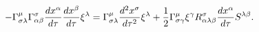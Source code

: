 \begin{equation}
-\Gamma _{\sigma \lambda }^{\mu }\Gamma _{\alpha \beta }^{\sigma }\frac{%
dx^{\alpha }}{d\tau }\frac{dx^{\beta }}{d\tau }\xi ^{\lambda }=\Gamma
_{\sigma \lambda }^{\mu }\frac{d^{2}x^{\sigma }}{d\tau ^{2}}\xi ^{\lambda }+%
\frac{1}{2}\Gamma _{\sigma \gamma }^{\mu }\xi ^{\gamma }R_{\alpha \lambda
\beta }^{\sigma }\frac{dx^{\alpha }}{d\tau }S^{\lambda \beta }.  \label{25}
\end{equation}

